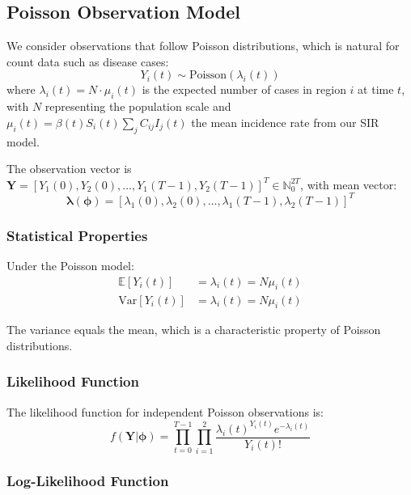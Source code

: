 \subsection{Poisson Observation Model}

We consider observations that follow Poisson distributions, which is natural for count data such as disease cases:
\begin{equation}
Y_i(t) \sim \text{Poisson}(\lambda_i(t))
\end{equation}
where $\lambda_i(t) = N \cdot \mu_i(t)$ is the expected number of cases in region $i$ at time $t$, with $N$ representing the population scale and $\mu_i(t) = \beta(t) S_i(t) \sum_j C_{ij} I_j(t)$ the mean incidence rate from our SIR model.

The observation vector is $\mathbf{Y} = [Y_1(0), Y_2(0), \ldots, Y_1(T-1), Y_2(T-1)]^T \in \mathbb{N}_0^{2T}$, with mean vector:
\begin{equation}
\boldsymbol{\lambda}(\boldsymbol{\phi}) = [\lambda_1(0), \lambda_2(0), \ldots, \lambda_1(T-1), \lambda_2(T-1)]^T
\end{equation}

\subsubsection{Statistical Properties}

Under the Poisson model:
\begin{align}
\mathbb{E}[Y_i(t)] &= \lambda_i(t) = N \mu_i(t) \\
\text{Var}[Y_i(t)] &= \lambda_i(t) = N \mu_i(t)
\end{align}

The variance equals the mean, which is a characteristic property of Poisson distributions.

\subsubsection{Likelihood Function}

The likelihood function for independent Poisson observations is:
\begin{equation}
f(\mathbf{Y}|\boldsymbol{\phi}) = \prod_{t=0}^{T-1} \prod_{i=1}^{2} \frac{\lambda_i(t)^{Y_i(t)} e^{-\lambda_i(t)}}{Y_i(t)!}
\end{equation}

\subsubsection{Log-Likelihood Function}

